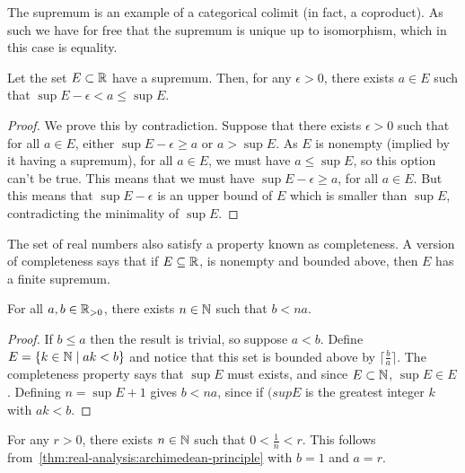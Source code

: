 \begin{categorybox}
  The supremum is an example of a categorical colimit (in fact, a coproduct). As such we have for free that the supremum is unique up to isomorphism, which in this case is equality.
\end{categorybox}

\begin{theorem}\label{thm:real-analysis:approximation-property-for-suprema}
  Let the set \(E \subset \mathbb{R}\) have a supremum. Then, for any \(\epsilon > 0\), there exists \(a \in E\) such that \(\sup E - \epsilon < a \leq \sup E\).
\end{theorem}

\begin{proof}
  We prove this by contradiction. Suppose that there exists \(\epsilon > 0\) such that for all \(a \in E\), either \(\sup E - \epsilon \geq a\) or \(a > \sup E\). As \(E\) is nonempty (implied by it having a supremum), for all \(a \in E\), we must have \(a \leq \sup E\), so this option can't be true. This means that we must have \(\sup E - \epsilon \geq a\), for all \(a \in E\). But this means that \(\sup E - \epsilon\) is an upper bound of \(E\) which is smaller than \(\sup E\), contradicting the minimality of \(\sup E\).
\end{proof}

The set of real numbers also satisfy a property known as completeness. A version of completeness says that if \(E \subseteq \mathbb{R}\), is nonempty and bounded above, then \(E\) has a finite supremum.

\begin{theorem}\label{thm:real-analysis:archimedean-principle}
  For all \(a, b \in \mathbb{R}_{> 0}\), there exists \(n \in \mathbb{N}\) such that \(b < na\).
\end{theorem}

\begin{proof}
  If \(b \leq a\) then the result is trivial, so suppose \(a < b\). Define \(E = \{ k \in \mathbb{N} \mid ak < b \}\) and notice that this set is bounded above by \(\lceil \frac b a \rceil\). The completeness property says that \(\sup E\) must exists, and since \(E \subset \mathbb{N}\), \(\sup E \in E\). Defining \(n = \sup E + 1\) gives \(b < n a\), since if \((sup E\) is the greatest integer \(k\) with \(ak < b\).
\end{proof}

\begin{example}
  For any \(r > 0\), there exists \(n \in \mathbb{N}\) such that \(0 < \frac 1 n < r\). This follows from~\ref{thm:real-analysis:archimedean-principle} with \(b = 1\) and \(a = r\).
\end{example}


